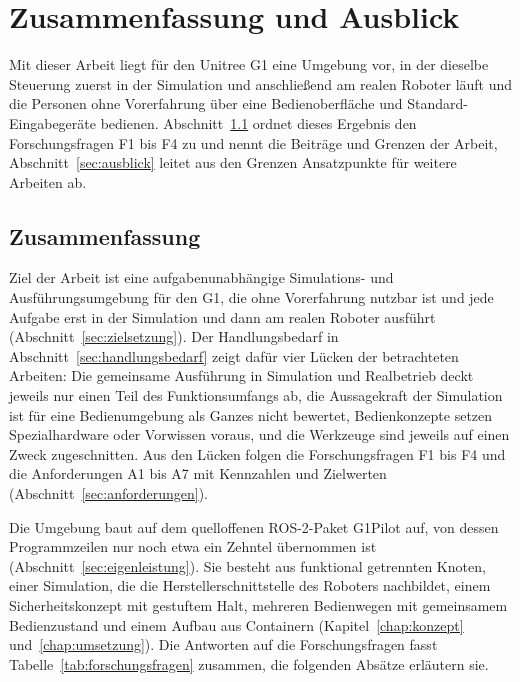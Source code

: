 \chapter{Zusammenfassung und Ausblick}
\label{chap:zusammenfassung}
Mit dieser Arbeit liegt für den Unitree G1 eine Umgebung vor, in der dieselbe Steuerung zuerst in der Simulation und anschließend am realen Roboter läuft und die Personen ohne Vorerfahrung über eine Bedienoberfläche und Standard-Eingabegeräte bedienen.
Abschnitt~\ref{sec:zusammenfassung} ordnet dieses Ergebnis den Forschungsfragen F1 bis F4 zu und nennt die Beiträge und Grenzen der Arbeit, Abschnitt~\ref{sec:ausblick} leitet aus den Grenzen Ansatzpunkte für weitere Arbeiten ab.

\section{Zusammenfassung}
\label{sec:zusammenfassung}
Ziel der Arbeit ist eine aufgabenunabhängige Simulations- und Ausführungsumgebung für den G1, die ohne Vorerfahrung nutzbar ist und jede Aufgabe erst in der Simulation und dann am realen Roboter ausführt (Abschnitt~\ref{sec:zielsetzung}).
Der Handlungsbedarf in Abschnitt~\ref{sec:handlungsbedarf} zeigt dafür vier Lücken der betrachteten Arbeiten: Die gemeinsame Ausführung in Simulation und Realbetrieb deckt jeweils nur einen Teil des Funktionsumfangs ab, die Aussagekraft der Simulation ist für eine Bedienumgebung als Ganzes nicht bewertet, Bedienkonzepte setzen Spezialhardware oder Vorwissen voraus, und die Werkzeuge sind jeweils auf einen Zweck zugeschnitten.
Aus den Lücken folgen die Forschungsfragen F1 bis F4 und die Anforderungen A1 bis A7 mit Kennzahlen und Zielwerten (Abschnitt~\ref{sec:anforderungen}).

Die Umgebung baut auf dem quelloffenen ROS-2-Paket G1Pilot auf, von dessen Programmzeilen nur noch etwa ein Zehntel übernommen ist (Abschnitt~\ref{sec:eigenleistung}).
Sie besteht aus funktional getrennten Knoten, einer Simulation, die die Herstellerschnittstelle des Roboters nachbildet, einem Sicherheitskonzept mit gestuftem Halt, mehreren Bedienwegen mit gemeinsamem Bedienzustand und einem Aufbau aus Containern (Kapitel~\ref{chap:konzept} und~\ref{chap:umsetzung}).
Die Antworten auf die Forschungsfragen fasst Tabelle~\ref{tab:forschungsfragen} zusammen, die folgenden Absätze erläutern sie.

